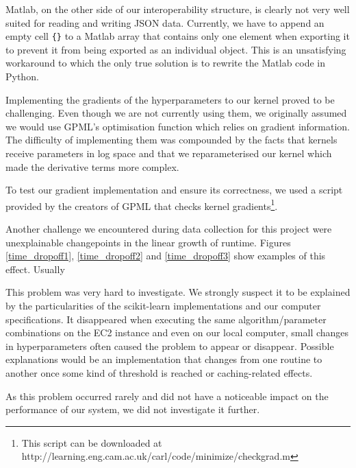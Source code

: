 \documentclass[a4paper,12pt,twoside,openright]{report}
\begin{document}
Matlab, on the other side of our interoperability structure, is clearly not very well suited for reading and writing JSON data. Currently, we have to append an empty cell \texttt{\{\}} to a Matlab array that contains only one element when exporting it to prevent it from being exported as an individual object. This is an unsatisfying workaround to which the only true solution is to rewrite the Matlab code in Python.

Implementing the gradients of the hyperparameters to our kernel proved to be challenging. Even though we are not currently using them, we originally assumed we would use GPML's optimisation function which relies on gradient information. The difficulty of implementing them was compounded by the facts that kernels receive parameters in log space and that we reparameterised our kernel which made the derivative terms more complex.

To test our gradient implementation and ensure its correctness, we used a script provided by the creators of GPML that checks kernel gradients\footnote{This script can be downloaded at http://learning.eng.cam.ac.uk/carl/code/minimize/checkgrad.m}. %

Another challenge we encountered during data collection for this project were unexplainable changepoints in the linear growth of runtime. Figures \ref{time_dropoff1}, \ref{time_dropoff2} and \ref{time_dropoff3} show examples of this effect. Usually

This problem was very hard to investigate. We strongly suspect it to be explained by the particularities of the scikit-learn implementations and our computer specifications. It  disappeared when executing the same algorithm/parameter combinations on the EC2 instance and even on our local computer, small changes in hyperparameters often caused the problem to appear or disappear. Possible explanations would be an implementation that changes from one routine to another once some kind of threshold is reached or caching-related effects.

As this problem occurred rarely and did not have a noticeable impact on the performance of our system, we did not investigate it further.


\end{document}

